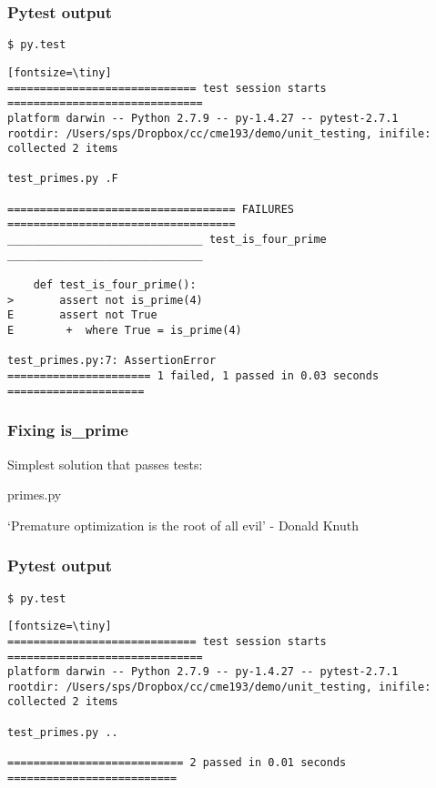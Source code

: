 \begin{frame}[fragile]\frametitle{Pytest output}

\begin{verbatim}
$ py.test
\end{verbatim}

\begin{verbatim}[fontsize=\tiny]
============================= test session starts ==============================
platform darwin -- Python 2.7.9 -- py-1.4.27 -- pytest-2.7.1
rootdir: /Users/sps/Dropbox/cc/cme193/demo/unit_testing, inifile:
collected 2 items

test_primes.py .F

=================================== FAILURES ===================================
______________________________ test_is_four_prime ______________________________

    def test_is_four_prime():
>       assert not is_prime(4)
E       assert not True
E        +  where True = is_prime(4)

test_primes.py:7: AssertionError
====================== 1 failed, 1 passed in 0.03 seconds =====================
\end{verbatim}

\end{frame}

\begin{frame}\frametitle{Fixing is\_prime}

Simplest solution that passes tests:

primes.py


`Premature optimization is the root of all evil' - Donald Knuth

\end{frame}

\begin{frame}[fragile]\frametitle{Pytest output}

\begin{verbatim}
$ py.test
\end{verbatim}

\begin{verbatim}[fontsize=\tiny]
============================= test session starts ==============================
platform darwin -- Python 2.7.9 -- py-1.4.27 -- pytest-2.7.1
rootdir: /Users/sps/Dropbox/cc/cme193/demo/unit_testing, inifile:
collected 2 items

test_primes.py ..

=========================== 2 passed in 0.01 seconds ==========================
\end{verbatim}

\end{frame}


